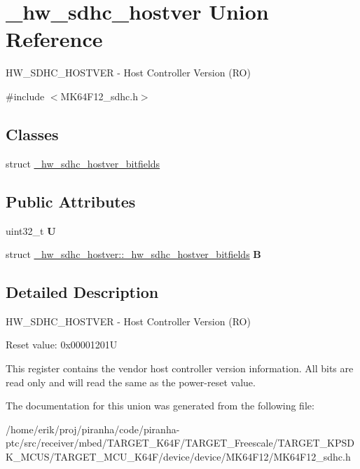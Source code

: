 \hypertarget{union__hw__sdhc__hostver}{}\section{\+\_\+hw\+\_\+sdhc\+\_\+hostver Union Reference}
\label{union__hw__sdhc__hostver}


H\+W\+\_\+\+S\+D\+H\+C\+\_\+\+H\+O\+S\+T\+V\+ER -\/ Host Controller Version (RO)  




{\ttfamily \#include $<$M\+K64\+F12\+\_\+sdhc.\+h$>$}

\subsection*{Classes}
\begin{DoxyCompactItemize}
\item 
struct \hyperlink{struct__hw__sdhc__hostver_1_1__hw__sdhc__hostver__bitfields}{\+\_\+hw\+\_\+sdhc\+\_\+hostver\+\_\+bitfields}
\end{DoxyCompactItemize}
\subsection*{Public Attributes}
\begin{DoxyCompactItemize}
\item 
uint32\+\_\+t {\bfseries U}\hypertarget{union__hw__sdhc__hostver_ad79f21f7593c07844f4e9268c56898ca}{}\label{union__hw__sdhc__hostver_ad79f21f7593c07844f4e9268c56898ca}

\item 
struct \hyperlink{struct__hw__sdhc__hostver_1_1__hw__sdhc__hostver__bitfields}{\+\_\+hw\+\_\+sdhc\+\_\+hostver\+::\+\_\+hw\+\_\+sdhc\+\_\+hostver\+\_\+bitfields} {\bfseries B}\hypertarget{union__hw__sdhc__hostver_adbaec2392fc9f3e0f6cff6a6bff56c05}{}\label{union__hw__sdhc__hostver_adbaec2392fc9f3e0f6cff6a6bff56c05}

\end{DoxyCompactItemize}


\subsection{Detailed Description}
H\+W\+\_\+\+S\+D\+H\+C\+\_\+\+H\+O\+S\+T\+V\+ER -\/ Host Controller Version (RO) 

Reset value\+: 0x00001201U

This register contains the vendor host controller version information. All bits are read only and will read the same as the power-\/reset value. 

The documentation for this union was generated from the following file\+:\begin{DoxyCompactItemize}
\item 
/home/erik/proj/piranha/code/piranha-\/ptc/src/receiver/mbed/\+T\+A\+R\+G\+E\+T\+\_\+\+K64\+F/\+T\+A\+R\+G\+E\+T\+\_\+\+Freescale/\+T\+A\+R\+G\+E\+T\+\_\+\+K\+P\+S\+D\+K\+\_\+\+M\+C\+U\+S/\+T\+A\+R\+G\+E\+T\+\_\+\+M\+C\+U\+\_\+\+K64\+F/device/device/\+M\+K64\+F12/M\+K64\+F12\+\_\+sdhc.\+h\end{DoxyCompactItemize}
